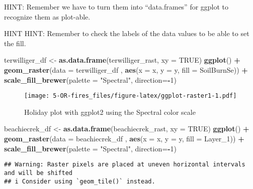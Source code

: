 \documentclass[
]{article}
\newenvironment{Shaded}{\begin{snugshade}}{\end{snugshade}}
\newcommand{\AttributeTok}[1]{\textcolor[rgb]{0.13,0.29,0.53}{#1}}
\newcommand{\ConstantTok}[1]{\textcolor[rgb]{0.56,0.35,0.01}{#1}}
\newcommand{\DecValTok}[1]{\textcolor[rgb]{0.00,0.00,0.81}{#1}}
\newcommand{\FunctionTok}[1]{\textcolor[rgb]{0.13,0.29,0.53}{\textbf{#1}}}
\newcommand{\NormalTok}[1]{#1}
\newcommand{\OtherTok}[1]{\textcolor[rgb]{0.56,0.35,0.01}{#1}}
\newcommand{\SpecialCharTok}[1]{\textcolor[rgb]{0.81,0.36,0.00}{\textbf{#1}}}
\newcommand{\StringTok}[1]{\textcolor[rgb]{0.31,0.60,0.02}{#1}}
\begin{document}
HINT: Remember we have to turn them into ``data.frames'' for ggplot to
recognize them as plot-able.

HINT HINT: Remember to check the labels of the data values to be able to
set the fill.

\begin{Shaded}
\begin{Highlighting}[]
\NormalTok{terwilliger\_df }\OtherTok{\textless{}{-}} \FunctionTok{as.data.frame}\NormalTok{(terwilliger\_rast, }\AttributeTok{xy =} \ConstantTok{TRUE}\NormalTok{)}
\FunctionTok{ggplot}\NormalTok{() }\SpecialCharTok{+}
    \FunctionTok{geom\_raster}\NormalTok{(}\AttributeTok{data =}\NormalTok{ terwilliger\_df , }\FunctionTok{aes}\NormalTok{(}\AttributeTok{x =}\NormalTok{ x, }\AttributeTok{y =}\NormalTok{ y, }\AttributeTok{fill =}\NormalTok{ SoilBurnSe)) }\SpecialCharTok{+}
    \FunctionTok{scale\_fill\_brewer}\NormalTok{(}\AttributeTok{palette =} \StringTok{"Spectral"}\NormalTok{, }\AttributeTok{direction=}\SpecialCharTok{{-}}\DecValTok{1}\NormalTok{)}
\end{Highlighting}
\end{Shaded}

\begin{figure}
\centering
\texttt{[image: 5-OR-fires\_files/figure-latex/ggplot-raster1-1.pdf]}
\caption{Holiday plot with ggplot2 using the Spectral color scale}
\end{figure}

\begin{Shaded}
\begin{Highlighting}[]
\NormalTok{beachiecrek\_df }\OtherTok{\textless{}{-}} \FunctionTok{as.data.frame}\NormalTok{(beachiecrek\_rast, }\AttributeTok{xy =} \ConstantTok{TRUE}\NormalTok{)}
\FunctionTok{ggplot}\NormalTok{() }\SpecialCharTok{+}
    \FunctionTok{geom\_raster}\NormalTok{(}\AttributeTok{data =}\NormalTok{ beachiecrek\_df , }\FunctionTok{aes}\NormalTok{(}\AttributeTok{x =}\NormalTok{ x, }\AttributeTok{y =}\NormalTok{ y, }\AttributeTok{fill =}\NormalTok{ Layer\_1)) }\SpecialCharTok{+}
    \FunctionTok{scale\_fill\_brewer}\NormalTok{(}\AttributeTok{palette =} \StringTok{"Spectral"}\NormalTok{, }\AttributeTok{direction=}\SpecialCharTok{{-}}\DecValTok{1}\NormalTok{)}
\end{Highlighting}
\end{Shaded}

\begin{verbatim}
## Warning: Raster pixels are placed at uneven horizontal intervals and will be shifted
## i Consider using `geom_tile()` instead.
\end{verbatim}
\end{document}
